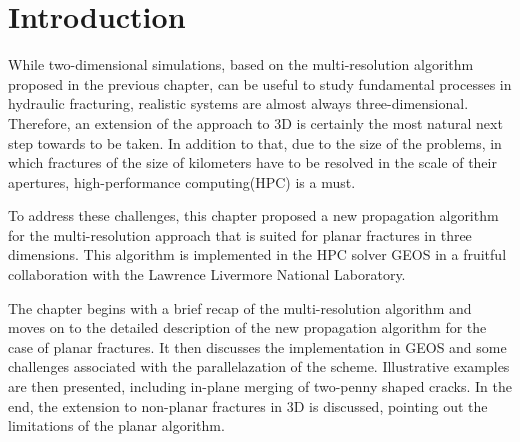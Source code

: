 \section{Introduction}
\label{section: Chapter4/intro}

While two-dimensional simulations, based on the multi-resolution algorithm proposed in the previous chapter, can be useful to study fundamental processes in hydraulic fracturing, realistic systems are almost always three-dimensional. Therefore, an extension of the approach to 3D is certainly the most natural next step towards to be taken. In addition to that, due to the size of the problems, in which fractures of the size of kilometers have to be resolved in the scale of their apertures, high-performance computing(HPC) is a must. 

To address these challenges, this chapter proposed a new propagation algorithm for the multi-resolution approach that is suited for planar fractures in three dimensions. This algorithm is implemented in the HPC solver GEOS \cite{settgast2012simulation,settgast2014simulation,settgast2017fully} in a fruitful collaboration with the Lawrence Livermore National Laboratory. 

The chapter begins with a brief recap of the multi-resolution algorithm and moves on to the detailed description of the new propagation algorithm for the case of planar fractures. It then discusses the implementation in GEOS and some challenges associated with the parallelazation of the scheme. Illustrative examples are then presented, including in-plane merging of two-penny shaped cracks.
In the end, the extension to non-planar fractures in 3D is discussed, pointing out the limitations of the planar algorithm.  





